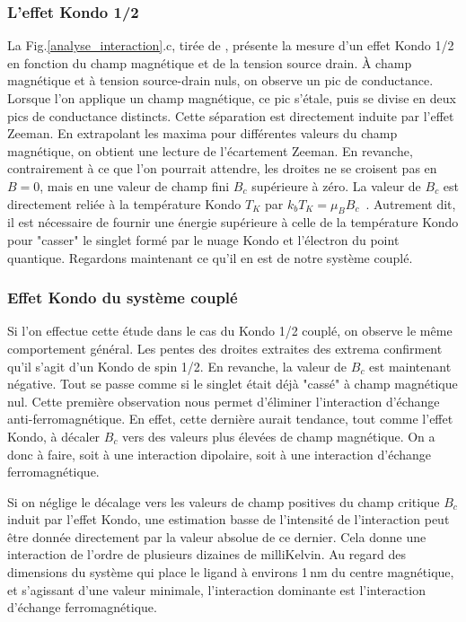 \subsubsection{L'effet Kondo 1/2}
La Fig.\ref{analyse_interaction}.c, tirée de \cite{Roch2009}, présente la mesure d'un effet Kondo 1/2 en fonction du champ magnétique et de la tension source drain. \`A champ magnétique et  à tension source-drain nuls, on observe un pic de conductance. Lorsque l'on applique un champ magnétique, ce pic s'étale, puis se divise en deux pics de conductance distincts. Cette séparation est directement induite par l'effet Zeeman. En extrapolant les maxima pour différentes valeurs du champ magnétique, on obtient une lecture de l'écartement Zeeman. En revanche, contrairement à ce que l'on pourrait attendre, les droites ne se croisent pas en $B=0$, mais en une valeur de champ fini $B_c$ supérieure à zéro. La valeur de $B_c$ est directement reliée à la température Kondo $T_K$ par $k_bT_K = \mu_B B_c$~\cite{Roch2009}. Autrement dit, il est nécessaire de fournir une énergie supérieure à celle de la température Kondo pour "casser" le singlet formé par le nuage Kondo et l'électron du point quantique. Regardons maintenant ce qu'il en est de notre système couplé.

\subsubsection{Effet Kondo du système couplé}
Si l'on effectue cette étude dans le cas du Kondo 1/2 couplé, on observe le même comportement général. Les pentes des droites extraites des extrema confirment qu'il s'agit d'un Kondo de spin 1/2. En revanche, la valeur de $B_c$ est maintenant négative. Tout se passe comme si le singlet était déjà "cassé" à champ magnétique nul. Cette première observation nous permet d'éliminer l'interaction d'échange anti-ferromagnétique. En effet, cette dernière aurait tendance, tout comme l'effet Kondo, à décaler $B_c$ vers des valeurs plus élevées de champ magnétique. On a donc à faire, soit à une interaction dipolaire, soit à une interaction d'échange ferromagnétique.

Si on néglige le décalage vers les valeurs de champ positives du champ critique $B_c$ induit par l'effet Kondo, une estimation basse de l'intensité de l'interaction peut être donnée directement par la valeur absolue de ce dernier. Cela donne une interaction de l'ordre de plusieurs dizaines de milliKelvin. Au regard des dimensions du système qui place le ligand à environs 1\,nm du centre magnétique, et s'agissant d'une valeur minimale, l'interaction dominante est l'interaction d'échange ferromagnétique.

